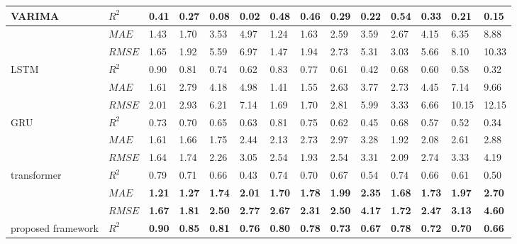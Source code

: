\begin{table}[htbp]
{\begin{tabular}{llllllllllllll}
  VARIMA & $R^{2}$ & 0.41 & 0.27 & 0.08 & 0.02 & 0.48 & 0.46 & 0.29 & 0.22 & 0.54 & 0.33 & 0.21 & 0.15\\
  \hline
  ~ & $MAE$ & 1.43 & 1.70 & 3.53 & 4.97 & 1.24 & 1.63 & 2.59 & 3.59 & 2.67 & 4.15 & 6.35 & 8.88\\
  ~ & $RMSE$ & 1.65 & 1.92 & 5.59 & 6.97 & 1.47 & 1.94 & 2.73 & 5.31 & 3.03 & 5.66 & 8.10 & 10.33\\
  LSTM &  $R^{2}$ & 0.90 & 0.81 & 0.74 & 0.62 & 0.83 & 0.77 & 0.61 & 0.42 & 0.68 & 0.60 & 0.58 & 0.32\\
  \hline
  ~ & $MAE$ & 1.61 & 2.79 & 4.18 & 4.98 & 1.41 & 1.55 & 2.63 & 3.77 & 2.73 & 4.45 & 7.14 & 9.66\\
  ~ & $RMSE$ & 2.01 & 2.93 & 6.21 & 7.14 & 1.69 & 1.70 & 2.81 & 5.99 & 3.33 & 6.66 & 10.15 & 12.15\\
  GRU &  $R^{2}$ & 0.73 & 0.70 & 0.65& 0.63 & 0.81 & 0.75 & 0.62 & 0.45 & 0.68 & 0.57 & 0.52 & 0.34\\
  \hline
  ~ & $MAE$ & 1.61 & 1.66 & 1.75 & 2.44 & 2.13 & 2.73 & 2.97 & 3.28 & 1.92 & 2.08 & 2.61 & 2.88\\
  ~ & $RMSE$ & 1.64 & 1.74 & 2.26 & 3.05 & 2.54 & 1.93 & 2.54 & 3.31 & 2.09 & 2.74 & 3.33 & 4.19\\
  transformer & $R^{2}$ & 0.79 & 0.71 & 0.66 & 0.43 & 0.74 & 0.70 & 0.67 & 0.54 & 0.74 & 0.66 & 0.61 & 0.50\\
  \hline
  ~ & $MAE$ & \textbf{1.21} & \textbf{1.27} & \textbf{1.74}& \textbf{2.01} & \textbf{1.70} & \textbf{1.78} & \textbf{1.99}& \textbf{2.35} & \textbf{1.68} & \textbf{1.73} & \textbf{1.97}& \textbf{2.70}\\
  ~ & $RMSE$ & \textbf{1.67} & \textbf{1.81} & \textbf{2.50}& \textbf{2.77} & \textbf{2.67} & \textbf{2.31} & \textbf{2.50}& \textbf{4.17} & \textbf{1.72} & \textbf{2.47} & \textbf{3.13}& \textbf{4.60}\\
  proposed framework & $R^{2}$& \textbf{0.90} & \textbf{0.85} & \textbf{0.81}& \textbf{0.76} & \textbf{0.80} & \textbf{0.78} & \textbf{0.73}& \textbf{0.67} & \textbf{0.78} & \textbf{0.72} & \textbf{0.70}& \textbf{0.66}\\
  \hline
\end{tabular}}
\end{table}

